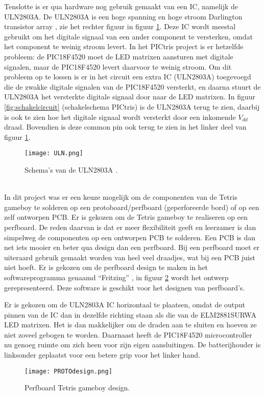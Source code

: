 Tenslotte is er qua hardware nog gebruik gemaakt van een IC, namelijk de ULN2803A. 
De ULN2803A is een hoge spanning en hoge stroom Darlington transistor array \cite{ULN2803A_datasheet}, zie het rechter figuur in figuur \ref{fig:ULN}. Deze IC wordt meestal gebruikt om het digitale signaal van een ander component te versterken, omdat het component te weinig stroom levert. 
In het PICtris project is er hetzelfde probleem: de PIC18F4520 moet de LED matrixen aansturen met digitale signalen, maar de PIC18F4520 levert daarvoor te weinig stroom. 
Om dit probleem op te lossen is er in het circuit een extra IC (ULN2803A) toegevoegd die de zwakke digitale signalen van de PIC18F4520 versterkt, en daarna stuurt de ULN2803A het versterkte digitale signaal door naar de LED matrixen. 
In figuur \ref{fig:schakelcircuit} (schakelschema PICtris) is de ULN2803A terug te zien, daarbij is ook te zien hoe het digitale signaal wordt versterkt door een inkomende \(V_{dd}\) draad. Bovendien is deze common pin ook terug te zien in het linker deel van figuur \ref{fig:ULN}.
\begin{figure}[h]
    \centering
    \texttt{[image: ULN.png]}
    \caption{Schema's van de ULN2803A \cite{ULN2803A_datasheet}.}
    \label{fig:ULN}
    \end{figure}\\
In dit project was er een keuze mogelijk om de componenten van de Tetris gameboy te solderen op een protoboard/perfboard (geperforeerde bord) of op een zelf ontworpen PCB. 
Er is gekozen om de Tetris gameboy te realiseren op een perfboard. De reden daarvan is dat er meer flexibiliteit geeft en leerzamer is dan simpelweg de componenten op een ontworpen PCB te solderen. 
Een PCB is dan net iets mooier en beter qua design dan een perfboard. Bij een perfboard moet er uiteraard gebruik gemaakt worden van heel veel draadjes, wat bij een PCB juist niet hoeft. 
Er is gekozen om de perfboard design te maken in het softwareprogramma genaamd ``Fritzing'' \cite{Fritzing}, in figuur \ref{fig:perfPIC} wordt het ontwerp gerepresenteerd. 
Deze software is geschikt voor het designen van perfboard's. 
 
Er is gekozen om de ULN2803A IC horizontaal te plaatsen, omdat de output pinnen van de IC dan in dezelfde richting staan als die van de ELM2881SURWA LED matrixen. 
Het is dan makkelijker om de draden aan te sluiten en hoeven ze niet zoveel gebogen te worden. Daarnaast heeft de PIC18F4520 microcontroller nu genoeg ruimte om zich heen voor zijn eigen aansluitingen. 
De batterijhouder is linksonder geplaatst voor een betere grip voor het linker hand.
\begin{figure}[h]
    \centering
    \texttt{[image: PROTOdesign.png]}
    \caption{Perfboard Tetris gameboy design.}
    \label{fig:perfPIC}
    \end{figure}
